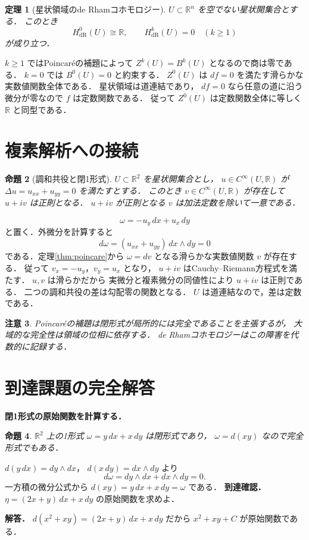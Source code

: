 \documentclass[a5paper,10pt,onecolumn]{jsarticle}
\makeatletter
\theoremstyle{mathnotetheorem}
\newtheorem{theorem}{定理}[section]
\newtheorem{proposition}[theorem]{命題}
\newtheorem{remark}[theorem]{注意}
\renewcommand{\proofname}{証明}
\renewenvironment{proof}[1][\proofname]{%
  \par\pushQED{\qed}\normalfont\topsep4\p@\@plus2\p@\relax
  \trivlist\item[\hskip\labelsep\bfseries #1]\ignorespaces
}{\popQED\endtrivlist\@endpefalse}
\makeatother
\begin{document}
\begin{theorem}[星状領域のde Rhamコホモロジー]\label{thm:star-cohom}
$U\subset\mathbb R^n$ を空でない星状開集合とする．
このとき
\[
 H_{\mathrm{dR}}^0(U)\cong\mathbb R,\qquad
 H_{\mathrm{dR}}^k(U)=0\quad(k\ge1)
\]
が成り立つ．
\end{theorem}
\begin{proof}
$k\ge1$ ではPoincar\'eの補題によって
$Z^k(U)=B^k(U)$ となるので商は零である．
$k=0$ では $B^0(U)=0$ と約束する．
$Z^0(U)$ は $df=0$ を満たす滑らかな実数値関数全体である．
星状領域は道連結であり，
$df=0$ なら任意の道に沿う微分が零なので
$f$ は定数関数である．
従って $Z^0(U)$ は定数関数全体に等しく
$\mathbb R$ と同型である．
\end{proof}

\section{複素解析への接続}

\begin{proposition}[調和共役と閉1形式]\label{prop:harmonic-conjugate}
$U\subset\mathbb R^2$ を星状開集合とし，
$u\in C^\infty(U,\mathbb R)$ が
$\Delta u=u_{xx}+u_{yy}=0$ を満たすとする．
このとき $v\in C^\infty(U,\mathbb R)$ が存在して
$u+iv$ は正則となる．
$u+iv$ が正則となる $v$ は加法定数を除いて一意である．
\end{proposition}
\begin{proof}
\[
 \omega=-u_y\,dx+u_x\,dy
\]
と置く．外微分を計算すると
\[
 d\omega=(u_{xx}+u_{yy})\,dx\wedge dy=0
\]
である．定理\ref{thm:poincare}から
$\omega=dv$ となる滑らかな実数値関数 $v$ が存在する．
従って
$v_x=-u_y$，$v_y=u_x$ となり，
$u+iv$ はCauchy--Riemann方程式を満たす．
$u,v$ は滑らかだから
実微分と複素微分の同値性により $u+iv$ は正則である．
二つの調和共役の差は勾配零の関数となる．
$U$ は道連結なので，差は定数である．
\end{proof}

\begin{remark}
Poincar\'eの補題は閉形式が局所的には完全であることを主張するが，
大域的な完全性は領域の位相に依存する．
de Rhamコホモロジーはこの障害を代数的に記録する．
\end{remark}


\section{到達課題の完全解答}
\noindent\textbf{閉1形式の原始関数を計算する．}
\begin{proposition}
$\mathbb R^2$ 上の1形式
$\omega=y\,dx+x\,dy$ は閉形式であり，
$\omega=d(xy)$ なので完全形式でもある．
\end{proposition}
\begin{proof}
$d(y\,dx)=dy\wedge dx$，
$d(x\,dy)=dx\wedge dy$ より
\[
d\omega=dy\wedge dx+dx\wedge dy=0.
\]
一方積の微分公式から
$d(xy)=y\,dx+x\,dy=\omega$ である．
\end{proof}
\noindent\textbf{到達確認．}
$\eta=(2x+y)\,dx+x\,dy$ の原始関数を求めよ．
\par\noindent\textbf{解答．}
$d(x^2+xy)=(2x+y)\,dx+x\,dy$ だから
$x^2+xy+C$ が原始関数である．
\end{document}
